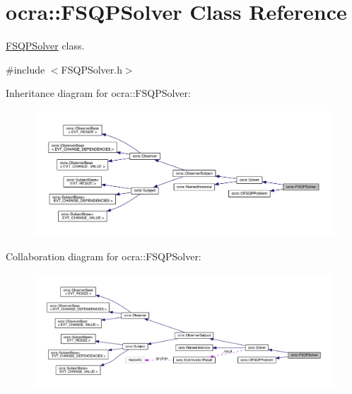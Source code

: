\hypertarget{classocra_1_1FSQPSolver}{}\section{ocra\+:\+:F\+S\+Q\+P\+Solver Class Reference}
\label{classocra_1_1FSQPSolver}


\hyperlink{classocra_1_1FSQPSolver}{F\+S\+Q\+P\+Solver} class.  




{\ttfamily \#include $<$F\+S\+Q\+P\+Solver.\+h$>$}



Inheritance diagram for ocra\+:\+:F\+S\+Q\+P\+Solver\+:\nopagebreak
\begin{figure}[H]
\begin{center}
\leavevmode
\includegraphics[width=350pt]{d6/d20/classocra_1_1FSQPSolver__inherit__graph}
\end{center}
\end{figure}


Collaboration diagram for ocra\+:\+:F\+S\+Q\+P\+Solver\+:\nopagebreak
\begin{figure}[H]
\begin{center}
\leavevmode
\includegraphics[width=350pt]{dd/df0/classocra_1_1FSQPSolver__coll__graph}
\end{center}
\end{figure}
